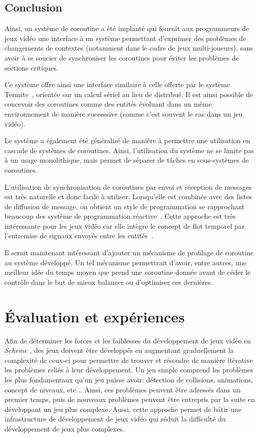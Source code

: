 \documentclass[12pt,twoside,letterpaper,francais]{book}
\newcommand{\Schemelang}{{\textit{Scheme }}}
\begin{document}
\FloatBarrier
\section{Conclusion}
Ainsi, un système de coroutine a été implanté qui fournit aux
programmeurs de jeux vidéo une interface à un système permettant
d'exprimer des problèmes de changements de contextes (notamment dans
le cadre de jeux multi-joueurs), sans avoir à se soucier de
synchroniser les coroutines pour éviter les problèmes de sections
critiques.

Ce système offre ainsi une interface similaire à celle offerte par le
système Termite~\cite{Termite_paper}, orientée sur un calcul sériel au
lieu de distribué. Il est ainsi possible de concevoir des coroutines
comme des entités évoluant dans un même environnement de manière
successive (comme c'est souvent le cas dans un jeu vidéo).

Le système a également été généralisé de manière à permettre une
utilisation en cascade de systèmes de coroutines. Ainsi, l'utilisation
du système ne se limite pas à un usage monolithique, mais permet de
séparer de tâches en sous-systèmes de coroutines.

L'utilisation de synchronisation de coroutines par envoi et réception
de messages est très naturelle et donc facile à utiliser. Lorsqu'elle
est combinée avec des listes de diffusion de message, on obtient un
style de programmation se rapprochant beaucoup des système de
programmation réactive~\cite{FRP}. Cette approche est très
intéressante pour les jeux vidéo car elle intègre le concept de flot
temporel par l'entremise de signaux envoyés entre les
entités~\cite{yampa}.

Il serait maintenant intéressant d'ajouter un mécanisme de profilage
de coroutine au système développé. Un tel mécanisme permettrait
d'avoir, entre autres, une meilleur idée du temps moyen que prend une
coroutine donnée avant de céder le contrôle dans le but de mieux
balancer ou d'optimiser ces dernières.

\clearpage

\chapter{Évaluation et expériences}\label{Chap:exp}
Afin de déterminer les forces et les faiblesses du développement de
jeux vidéo en \Schemelang, des jeux doivent être développés en
augmentant graduellement la complexité de ceux-ci pour permettre de
trouver et résoudre de manière itérative les problèmes reliés à leur
développement. Un jeu simple comprend les problèmes les plus
fondamentaux qu'un jeu puisse avoir: détection de collisions,
animations, concept de niveaux, etc... Ainsi, ces problèmes peuvent
être adressés dans un premier temps, puis de nouveaux problèmes
peuvent être entrepris par la suite en développant un jeu plus
complexe. Aussi, cette approche permet de bâtir une infrastructure de
développement de jeux vidéo qui réduit la difficulté du développement
de jeux plus complexes.
\end{document}
